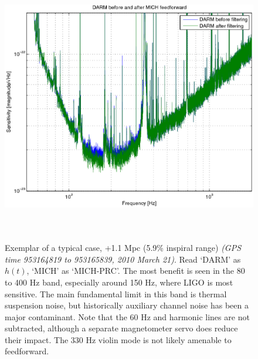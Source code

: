 \begin{figure}
\begin{center}
\includegraphics[height=120mm, width=150mm]{figure11.eps}
\caption{Exemplar of a typical case, +1.1 Mpc (5.9\% inspiral range)
\textit{(GPS time 953164819 to 953165839, 2010 March 21)}. Read `DARM' as $h(t)$, `MICH' as `MICH-PRC'. The most benefit is seen in the 80 to 400 Hz band, especially around 150 Hz, where LIGO is most sensitive. The main fundamental limit in this band is thermal suspension noise, but historically auxiliary channel noise has been a major contaminant. Note that the 60 Hz and harmonic lines are not subtracted, although a separate magnetometer servo does reduce their impact. The 330 Hz violin mode is not likely amenable to feedforward.}
\label{typicalInspiralGraph}
\end{center}
\end{figure}
